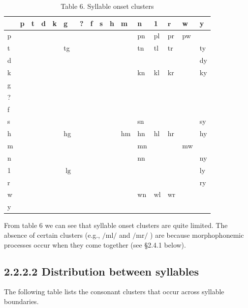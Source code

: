 \documentclass[10pt]{article}
\begin{document}
\begin{table}[h]
\begin{center}
\captionsetup{labelformat=empty}
\caption{Table 6. Syllable onset clusters}
\begin{tabular}{|l|l|l|l|l|l|l|l|l|l|l|l|l|l|l|l|}
\hline
 & p & t & d & k & g & ? & f & s & h & m & n & 1 & \(\mathbf{r}\) & w & y \\
\hline
p &  &  &  &  &  &  &  &  &  &  & pn & pl & pr & pw &  \\
\hline
t &  &  &  &  & tg &  &  &  &  &  & tn & tl & tr &  & ty \\
\hline
d &  &  &  &  &  &  &  &  &  &  &  &  &  &  & dy \\
\hline
k &  &  &  &  &  &  &  &  &  &  & kn & kl & kr &  & ky \\
\hline
g &  &  &  &  &  &  &  &  &  &  &  &  &  &  &  \\
\hline
? &  &  &  &  &  &  &  &  &  &  &  &  &  &  &  \\
\hline
f &  &  &  &  &  &  &  &  &  &  &  &  &  &  &  \\
\hline
s &  &  &  &  &  &  &  &  &  &  & sn &  &  &  & sy \\
\hline
h &  &  &  &  & hg &  &  &  &  & hm & hn & hl & hr &  & hy \\
\hline
m &  &  &  &  &  &  &  &  &  &  & mn &  &  & mw &  \\
\hline
n &  &  &  &  &  &  &  &  &  &  & nn &  &  &  & ny \\
\hline
1 &  &  &  &  & \(\lg\) &  &  &  &  &  &  &  &  &  & ly \\
\hline
r &  &  &  &  &  &  &  &  &  &  &  &  &  &  & ry \\
\hline
w &  &  &  &  &  &  &  &  &  &  & wn & wl & wr &  &  \\
\hline
y &  &  &  &  &  &  &  &  &  &  &  &  &  &  &  \\
\hline
\end{tabular}
\end{center}
\end{table}

From table 6 we can see that syllable onset clusters are quite limited. The absence of certain clusters (e.g., \(/ \mathrm{ml} /\) and \(/ \mathrm{mr} /\) ) are because morphophonemic processes occur when they come together (see §2.4.1 below).

\subsection*{2.2.2.2 Distribution between syllables}
The following table lists the consonant clusters that occur across syllable boundaries.
\end{document}
